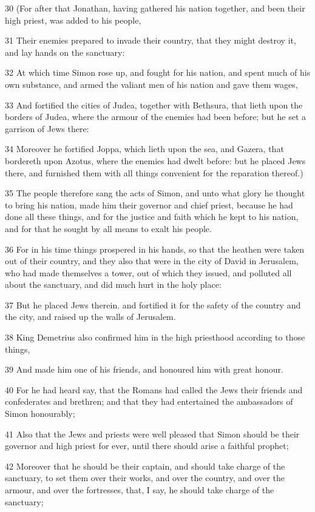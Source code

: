 \par 30 (For after that Jonathan, having gathered his nation together, and been their high priest, was added to his people,
\par 31 Their enemies prepared to invade their country, that they might destroy it, and lay hands on the sanctuary:
\par 32 At which time Simon rose up, and fought for his nation, and spent much of his own substance, and armed the valiant men of his nation and gave them wages,
\par 33 And fortified the cities of Judea, together with Bethsura, that lieth upon the borders of Judea, where the armour of the enemies had been before; but he set a garrison of Jews there:
\par 34 Moreover he fortified Joppa, which lieth upon the sea, and Gazera, that bordereth upon Azotus, where the enemies had dwelt before: but he placed Jews there, and furnished them with all things convenient for the reparation thereof.)
\par 35 The people therefore sang the acts of Simon, and unto what glory he thought to bring his nation, made him their governor and chief priest, because he had done all these things, and for the justice and faith which he kept to his nation, and for that he sought by all means to exalt his people.
\par 36 For in his time things prospered in his hands, so that the heathen were taken out of their country, and they also that were in the city of David in Jerusalem, who had made themselves a tower, out of which they issued, and polluted all about the sanctuary, and did much hurt in the holy place:
\par 37 But he placed Jews therein. and fortified it for the safety of the country and the city, and raised up the walls of Jerusalem.
\par 38 King Demetrius also confirmed him in the high priesthood according to those things,
\par 39 And made him one of his friends, and honoured him with great honour.
\par 40 For he had heard say, that the Romans had called the Jews their friends and confederates and brethren; and that they had entertained the ambassadors of Simon honourably;
\par 41 Also that the Jews and priests were well pleased that Simon should be their governor and high priest for ever, until there should arise a faithful prophet;
\par 42 Moreover that he should be their captain, and should take charge of the sanctuary, to set them over their works, and over the country, and over the armour, and over the fortresses, that, I say, he should take charge of the sanctuary;
